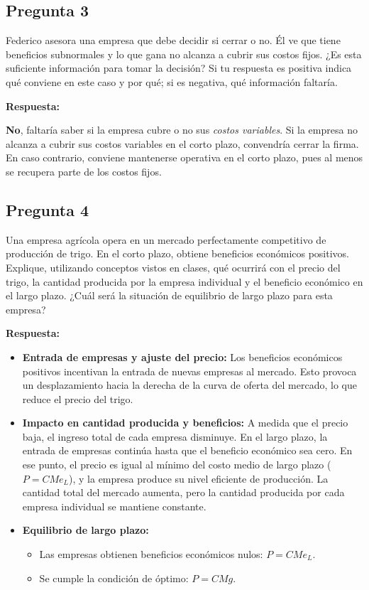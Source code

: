 \documentclass[12pt,letterpaper]{article}
\begin{document}
\subsection*{Pregunta 3}

Federico asesora una empresa que debe decidir si cerrar o no. Él ve que tiene beneficios subnormales y lo que gana no alcanza a cubrir sus costos fijos. ¿Es esta suficiente información para tomar la decisión? Si tu respuesta es positiva indica qué conviene en este caso y por qué; si es negativa, qué información faltaría.

\medskip
\textbf{Respuesta:}

\textbf{No}, faltaría saber si la empresa cubre o no sus \textit{costos variables}. Si la empresa no alcanza a cubrir sus costos variables en el corto plazo, convendría cerrar la firma. En caso contrario, conviene mantenerse operativa en el corto plazo, pues al menos se recupera parte de los costos fijos.

\subsection*{Pregunta 4}

Una empresa agrícola opera en un mercado perfectamente competitivo de producción de trigo. En el corto plazo, obtiene beneficios económicos positivos. Explique, utilizando conceptos vistos en clases, qué ocurrirá con el precio del trigo, la cantidad producida por la empresa individual y el beneficio económico en el largo plazo. ¿Cuál será la situación de equilibrio de largo plazo para esta empresa?

\medskip
\textbf{Respuesta:}

\begin{itemize}
    \item \textbf{Entrada de empresas y ajuste del precio:} Los beneficios económicos positivos incentivan la entrada de nuevas empresas al mercado. Esto provoca un desplazamiento hacia la derecha de la curva de oferta del mercado, lo que reduce el precio del trigo.

    \item \textbf{Impacto en cantidad producida y beneficios:} A medida que el precio baja, el ingreso total de cada empresa disminuye. En el largo plazo, la entrada de empresas continúa hasta que el beneficio económico sea cero. En ese punto, el precio es igual al mínimo del costo medio de largo plazo ($P = CMe_L$), y la empresa produce su nivel eficiente de producción. La cantidad total del mercado aumenta, pero la cantidad producida por cada empresa individual se mantiene constante.

    \item \textbf{Equilibrio de largo plazo:}
    \begin{itemize}
        \item Las empresas obtienen beneficios económicos nulos: $P = CMe_L$.
        \item Se cumple la condición de óptimo: $P = CMg$.
    \end{itemize}
\end{itemize}
\end{document}
